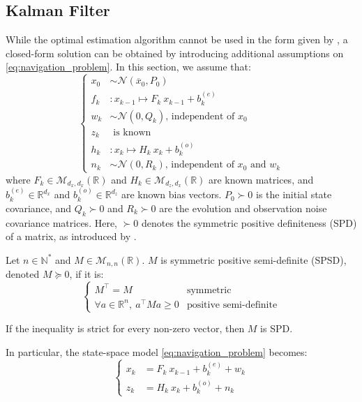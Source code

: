 \subsection{Kalman Filter}

While the optimal estimation algorithm cannot be used in the form given by , a closed-form solution can be obtained by introducing additional assumptions on \eqref{eq:navigation_problem}. In this section, we assume that:
\begin{equation}
	\left\{\begin{array}{ll}
	x_0&\sim\mathcal{N}(\overline{x}_0,P_0)\\
	f_k&:x_{k-1}\mapsto F_k\:x_{k-1}+b_k^{(e)}\\
	w_k&\sim\mathcal{N}(0,Q_k)\text{, independent of }x_0\\
	z_k&\text{ is known}\\
	h_k&:x_k\mapsto H_k\:x_k+b_k^{(o)}\\
	n_k&\sim\mathcal{N}(0,R_k)\text{, independent of }x_0\text{ and }w_k
	\end{array}\right.\label{eq:Kalman_assumptions}
\end{equation}
where $F_k\in\mathcal{M}_{d_x,d_x}(\mathbb{R})$ and $H_k\in\mathcal{M}_{d_z,d_x}(\mathbb{R})$ are known matrices, and $b_k^{(e)}\in\mathbb{R}^{d_x}$ and $b_k^{(o)}\in\mathbb{R}^{d_z}$ are known bias vectors. $P_0\succ0$ is the initial state covariance, and $Q_k\succ0$ and $R_k\succ0$ are the evolution and observation noise covariance matrices. Here, $\succ0$ denotes the symmetric positive definiteness (SPD) of a matrix, as introduced by .

\begin{definition}\label{th:matrix_SPSD}
	Let $n\in\mathbb{N}^*$ and $M\in\mathcal{M}_{n,n}(\mathbb{R})$. $M$ is symmetric positive semi-definite (SPSD), denoted $M\succeq0$, if it is:
	\begin{equation}
		\left\{\begin{array}{ll}
		M^\top=M&\text{symmetric}\\
		\forall a\in\mathbb{R}^n,\:a^\top Ma\geq0&\text{positive semi-definite}
		\end{array}\right.
	\end{equation}

	If the inequality is strict for every non-zero vector, then $M$ is SPD.
\end{definition}

In particular, the state-space model \eqref{eq:navigation_problem} becomes:
\begin{equation}
	\left\{\begin{aligned}
	x_k&=F_k\:x_{k-1}+b_k^{(e)}+w_k\\
	z_k&=H_k\:x_k+b_k^{(o)}+n_k
	\end{aligned}\right.\label{eq:navigation_Kalman}
\end{equation}

